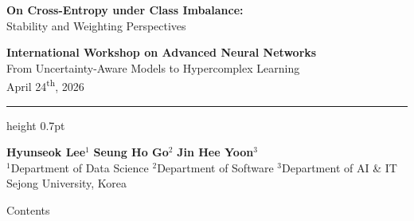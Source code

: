 \documentclass[aspectratio=169]{beamer}
\title{}
\author{}
\institute{}
\date{}
\renewcommand{\textbf}[1]{\textcolor{SejongBlue}{\sf\bfseries #1}}
\begin{document}
\begin{frame}[plain]

\vspace{0.7em} %
{\LARGE \textcolor{SejongBlue}{\textbf{On Cross-Entropy under Class Imbalance:}}}\\[0.55em]
{\Large Stability and Weighting Perspectives}

\vspace{1.2em} %

\begin{center}
  {\small \textbf{International Workshop on Advanced Neural Networks}}\\[0.35em]
  {\small From Uncertainty-Aware Models to Hypercomplex Learning}\\[0.6em]
  {\footnotesize April 24\textsuperscript{th}, 2026}\\[0.25em]
\end{center}

\vspace{1.0em}
{\color{SejongBlue}\hrule height 0.7pt}

\vspace{0.8em}
\begin{center}
{\Large
\textbf{Hyunseok Lee}$^{1}$ \quad
\textbf{Seung Ho Go}$^{2}$ \quad
\textbf{Jin Hee Yoon}$^{3}$
}\\[0.8em]

{\small %
$^{1}$Department of Data Science \hspace{1.0em}
$^{2}$Department of Software \hspace{1.0em}
$^{3}$Department of AI \& IT\\[0.35em]
Sejong University, Korea
}
\end{center}

\end{frame}

\begin{frame}{Contents}
  \tableofcontents
\end{frame}

\end{document}
